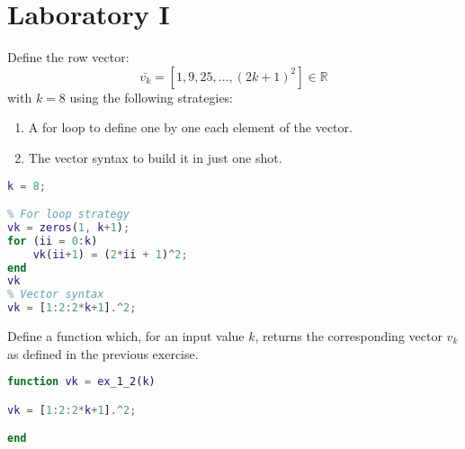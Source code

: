 \documentclass[12pt, a4paper]{report}
\newtheorem[style=M,bodystyle=\normalfont]{theorem}{Theorem}
\newtheorem[style=M,bodystyle=\normalfont]{corollary}{Corollary}
\newtheorem[style=M,bodystyle=\normalfont]{lemma}{Lemma}
\newtheorem[style=M,bodystyle=\normalfont]{definition}{Definition}
\begin{document}
\chapter{Laboratory I}
    \begin{Exercise}[label=1]
        Define the row vector: 
        \[ \bar{v_k} = [1,9,25,\dots,\left( 2k+1 \right)^2] \in \mathbb{R} \]
        with $k=8$ using the following strategies:
        \begin{enumerate}
            \item A for loop to define one by one each element of the vector.
            \item The vector syntax to build it in just one shot.
        \end{enumerate}
    \end{Exercise}
    \begin{Answer}[ref=1]
        \begin{lstlisting}[language=Matlab]
k = 8;

% For loop strategy
vk = zeros(1, k+1);
for (ii = 0:k)
    vk(ii+1) = (2*ii + 1)^2;
end
vk
% Vector syntax
vk = [1:2:2*k+1].^2;            
        \end{lstlisting}  
    \end{Answer}

    \newpage

    \begin{Exercise}[label=2]
        Define a function which, for an input value $k$, returns the corresponding vector $v_k$ as defined in the previous exercise.
    \end{Exercise}
    \begin{Answer}[ref=2]
        \begin{lstlisting}[language=Matlab]
function vk = ex_1_2(k)

vk = [1:2:2*k+1].^2;

end
        \end{lstlisting}
    \end{Answer}

    \newpage
\end{document}
